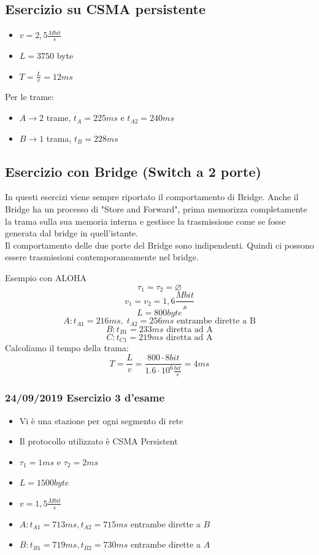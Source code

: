 \documentclass[a4paper]{article}
\begin{document}
\subsection{Esercizio su CSMA persistente} 

\begin{itemize}
    \item $v = 2,5\frac{Mbit}{s}$
    \item $L = 3750$ byte
    \item $T = \frac{L}{v} = 12ms$
\end{itemize}
Per le trame: 
\begin{itemize}
    \item $A \rightarrow 2$ trame, $t_A = 225ms$ e $t_{A2} = 240ms$
    \item $B \rightarrow 1$ trama, $t_B = 228ms$
\end{itemize}

\subsection{Esercizio con Bridge (Switch a 2 porte)}

In questi esercizi viene sempre riportato il comportamento di Bridge.
Anche il Bridge ha un processo di "Store and Forward", prima memorizza completamente la trama sulla sua memoria interna e
gestisce la trasmissione come se fosse generata dal bridge in quell'istante.
\\
Il comportamento delle due porte del Bridge sono indipendenti. Quindi ci possono essere trasmissioni contemporaneamente nel bridge.
\begin{examplebox}{Esempio con ALOHA}
    \[\tau_1 = \tau_2 = \varnothing\]
    \[v_1 = v_2 = 1,6 \frac{Mbit}{s}\]
    \[L = 800 byte\]
\[A: t_{A1} = 216ms,\; t_{A2} = 256ms \text{ entrambe dirette a B}\]
\[B: t_{B1} = 233ms \text{ diretta ad A}\]
\[C: t_{C1} = 219ms \text{ diretta ad A}\]
Calcoliamo il tempo della trama:
\[T = \frac{L}{v} = \frac{800 \cdot 8 bit}{1.6 \cdot 10^6 \frac{bit}{s}} = 4ms\]
\end{examplebox}

\subsubsection{24/09/2019 Esercizio 3 d'esame}

\begin{itemize}
    \item Vi è una stazione per ogni segmento di rete
    \item Il protocollo utilizzato è CSMA Persistent 
    \item $\tau_1 = 1ms$ e $\tau_2 = 2ms$ 
    \item $L = 1500 byte$
    \item $v = 1,5 \frac{Mbit}{s}$
    \item $A: t_{A1} = 713ms, t_{A2} = 715ms$ entrambe dirette a $B$
    \item $B: t_{B1} = 719ms, t_{B2} = 730ms$ entrambe dirette a $A$
\end{itemize}
\end{document}
